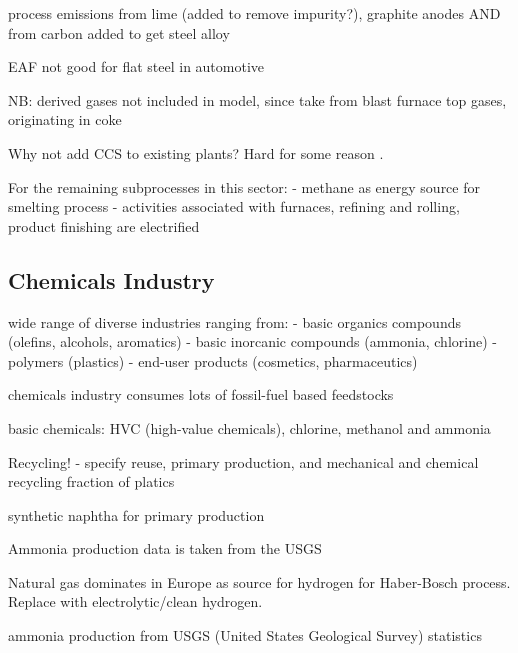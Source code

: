 process emissions from lime (added to remove impurity?), graphite anodes AND
from carbon added to get steel alloy  

EAF not good for flat steel in automotive

NB: derived gases not included in model, since take from blast furnace top
gases, originating in coke

Why not add CCS to existing plants? Hard for some reason .

For the remaining subprocesses in this sector:
- methane as energy source for smelting process
- activities associated with furnaces, refining and rolling, product finishing are electrified

\subsection{Chemicals Industry}
\label{sec:si:industry:chemicals}


wide range of diverse industries ranging from:
- basic organics compounds (olefins, alcohols, aromatics)
- basic inorcanic compounds (ammonia, chlorine)
- polymers (plastics)
- end-user products (cosmetics, pharmaceutics)

chemicals industry consumes lots of fossil-fuel based feedstocks 

basic chemicals: HVC (high-value chemicals), chlorine, methanol and ammonia

Recycling!
- specify reuse, primary production, and mechanical and chemical recycling
fraction of platics


synthetic naphtha for primary production

Ammonia production data is taken from the USGS

Natural gas dominates in Europe as source for hydrogen for Haber-Bosch process.
Replace with electrolytic/clean hydrogen.


ammonia production from USGS (United States Geological Survey) statistics

